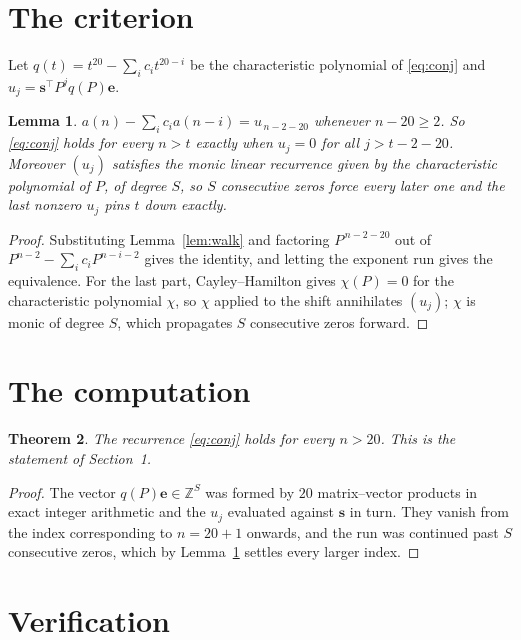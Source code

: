 \documentclass[11pt,a4paper]{article}
\theoremstyle{plain}
\newtheorem{theorem}{Theorem}
\newtheorem{lemma}[theorem]{Lemma}
\theoremstyle{definition}
\begin{document}
\section{The criterion}

Let $q(t)=t^{20}-\sum_i c_i t^{20-i}$ be the characteristic polynomial of
\eqref{eq:conj} and $u_j=\mathbf{s}^{\!\top}P^{j}q(P)\mathbf{e}$.

\begin{lemma}\label{lem:crit}
$a(n)-\sum_i c_i a(n-i)=u_{\,n-2-20}$ whenever $n-20\ge2$. So \eqref{eq:conj}
holds for every $n>t$ exactly when $u_j=0$ for all $j>t-2-20$. Moreover $(u_j)$
satisfies the monic linear recurrence given by the characteristic polynomial of $P$, of
degree $S$, so $S$ consecutive zeros force every later one and the last nonzero $u_j$ pins
$t$ down exactly.
\end{lemma}

\begin{proof}
Substituting Lemma~\ref{lem:walk} and factoring $P^{\,n-2-20}$ out of
$P^{n-2}-\sum_i c_i P^{n-i-2}$ gives the identity, and letting the exponent run gives the
equivalence. For the last part, Cayley--Hamilton gives $\chi(P)=0$ for the characteristic
polynomial $\chi$, so $\chi$ applied to the shift annihilates $(u_j)$; $\chi$ is monic of
degree $S$, which propagates $S$ consecutive zeros forward.
\end{proof}

\section{The computation}

\begin{theorem}
The recurrence \eqref{eq:conj} holds for every $n>20$. This is the statement of
Section~1.
\end{theorem}

\begin{proof}
The vector $q(P)\mathbf{e}\in\mathbb{Z}^{S}$ was formed by $20$ matrix--vector
products in exact integer arithmetic and the $u_j$ evaluated against $\mathbf{s}$ in turn.
They vanish from the index corresponding to $n=20+1$ onwards, and the run was continued
past $S$ consecutive zeros, which by Lemma~\ref{lem:crit} settles every larger index.
\end{proof}

\section{Verification}
\end{document}
